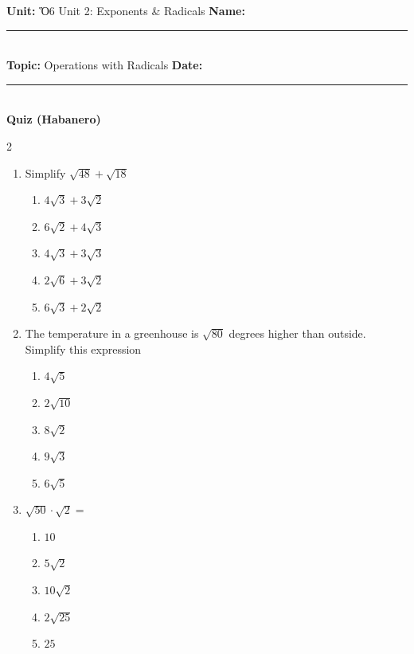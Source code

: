 \documentclass[10pt]{article}
\begin{document}
\enlargethispage{2.5cm}

\begin{tcolorbox}[colback=mainblue!5, colframe=mainblue, sharp corners, boxrule=0.5pt]
    \small \textbf{Unit:} Ὅ6 Unit 2: Exponents & Radicals \hfill \textbf{Name:} \rule{3cm}{0.4pt} \\
    \small \textbf{Topic:} Operations with Radicals \hfill \textbf{Date:} \rule{2cm}{0.4pt} \\
    \centering \textbf{\large Quiz (Habanero)}
\end{tcolorbox}

\vspace{0.2cm}

\begin{multicols}{2}
\begin{enumerate}[label=\textbf{Q\arabic*.}, leftmargin=*, itemsep=6pt, parsep=0pt]

  \item \small Simplify $\sqrt{48} + \sqrt{18}$
  \begin{enumerate}[label=(\Alph*), leftmargin=0.6cm, nosep, itemsep=2pt]
    \item $4\sqrt{3} + 3\sqrt{2}$
    \item $6\sqrt{2} + 4\sqrt{3}$
    \item $4\sqrt{3} + 3\sqrt{3}$
    \item $2\sqrt{6} + 3\sqrt{2}$
    \item $6\sqrt{3} + 2\sqrt{2}$
  \end{enumerate}

  \item \small The temperature in a greenhouse is $\sqrt{80}$ degrees higher than outside. Simplify this expression
  \begin{enumerate}[label=(\Alph*), leftmargin=0.6cm, nosep, itemsep=2pt]
    \item $4\sqrt{5}$
    \item $2\sqrt{10}$
    \item $8\sqrt{2}$
    \item $9\sqrt{3}$
    \item $6\sqrt{5}$
  \end{enumerate}

  \item \small $\sqrt{50} \cdot \sqrt{2} = $
  \begin{enumerate}[label=(\Alph*), leftmargin=0.6cm, nosep, itemsep=2pt]
    \item $10$
    \item $5\sqrt{2}$
    \item $10\sqrt{2}$
    \item $2\sqrt{25}$
    \item $25$
  \end{enumerate}


\end{enumerate}
\end{multicols}
\end{document}
